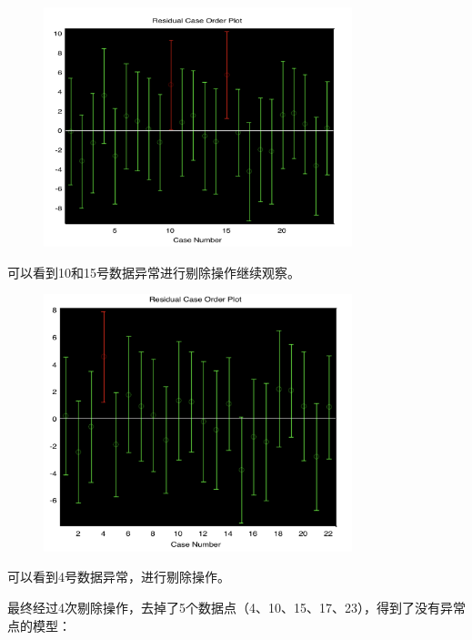 \documentclass{article}
\begin{document}
\begin{figure}[H]
    \centering
    \includegraphics[width=0.8\textwidth]{pic8.png}
\end{figure}

可以看到10和15号数据异常进行剔除操作继续观察。

\begin{figure}[H]
    \centering
    \includegraphics[width=0.8\textwidth]{pic9.png}
\end{figure}

可以看到4号数据异常，进行剔除操作。

最终经过4次剔除操作，去掉了5个数据点（4、10、15、17、23），得到了没有异常点的模型：
\end{document}
